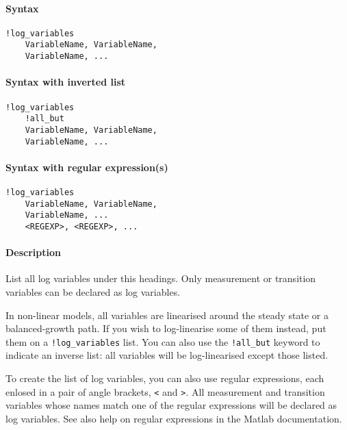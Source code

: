 


	\paragraph{Syntax}

\begin{verbatim}
!log_variables
    VariableName, VariableName, 
    VariableName, ...
\end{verbatim}

\paragraph{Syntax with inverted list}

\begin{verbatim}
!log_variables
    !all_but
    VariableName, VariableName, 
    VariableName, ...
\end{verbatim}

\paragraph{Syntax with regular
expression(s)}

\begin{verbatim}
!log_variables
    VariableName, VariableName, 
    VariableName, ...
    <REGEXP>, <REGEXP>, ...
\end{verbatim}

\paragraph{Description}

List all log variables under this headings. Only measurement or
transition variables can be declared as log variables.

In non-linear models, all variables are linearised around the steady
state or a balanced-growth path. If you wish to log-linearise some of
them instead, put them on a \texttt{!log\_variables} list. You can also
use the \texttt{!all\_but} keyword to indicate an inverse list: all
variables will be log-linearised except those listed.

To create the list of log variables, you can also use regular
expressions, each enlosed in a pair of angle brackets,
\texttt{\textless{}} and \texttt{\textgreater{}}. All measurement and
transition variables whose names match one of the regular expressions
will be declared as log variables. See also help on regular expressions
in the Matlab documentation.

